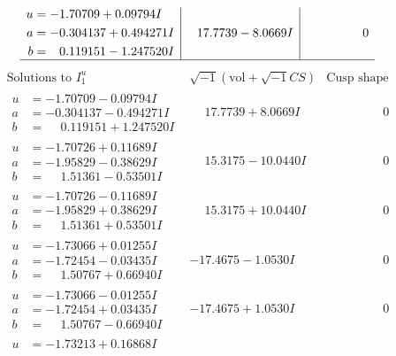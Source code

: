 \documentclass[1p]{elsarticle_modified}
\theoremstyle{definition}
\newcommand{\I}{\sqrt{-1}}
\begin{document}
$$\begin{array}{c|c|c}
\begin{aligned}
u &= -1.70709 + 0.09794 I \\
a &= -0.304137 + 0.494271 I \\
b &= \phantom{-}0.119151 - 1.247520 I\end{aligned}
 & \phantom{-}17.7739 - 8.0669 I & \phantom{-0.000000 } 0\\
 \hline 
 \end{array}$$\newpage$$\begin{array}{c|c|c}  
\text{Solutions to }I^u_{1}& \I (\text{vol} + \sqrt{-1}CS) & \text{Cusp shape}\\
 \hline 
\begin{aligned}
u &= -1.70709 - 0.09794 I \\
a &= -0.304137 - 0.494271 I \\
b &= \phantom{-}0.119151 + 1.247520 I\end{aligned}
 & \phantom{-}17.7739 + 8.0669 I & \phantom{-0.000000 } 0 \\ \hline\begin{aligned}
u &= -1.70726 + 0.11689 I \\
a &= -1.95829 - 0.38629 I \\
b &= \phantom{-}1.51361 - 0.53501 I\end{aligned}
 & \phantom{-}15.3175 - 10.0440 I & \phantom{-0.000000 } 0 \\ \hline\begin{aligned}
u &= -1.70726 - 0.11689 I \\
a &= -1.95829 + 0.38629 I \\
b &= \phantom{-}1.51361 + 0.53501 I\end{aligned}
 & \phantom{-}15.3175 + 10.0440 I & \phantom{-0.000000 } 0 \\ \hline\begin{aligned}
u &= -1.73066 + 0.01255 I \\
a &= -1.72454 - 0.03435 I \\
b &= \phantom{-}1.50767 + 0.66940 I\end{aligned}
 & -17.4675 - 1.0530 I & \phantom{-0.000000 } 0 \\ \hline\begin{aligned}
u &= -1.73066 - 0.01255 I \\
a &= -1.72454 + 0.03435 I \\
b &= \phantom{-}1.50767 - 0.66940 I\end{aligned}
 & -17.4675 + 1.0530 I & \phantom{-0.000000 } 0 \\ \hline\begin{aligned}
u &= -1.73213 + 0.16868 I \\

\end{aligned}
\end{array}$$
\end{document}
